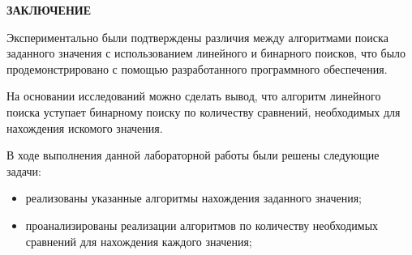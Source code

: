 \begin{center}
    \textbf{ЗАКЛЮЧЕНИЕ}
\end{center}

Экспериментально были подтверждены различия между алгоритмами поиска заданного значения с использованием линейного и бинарного поисков, что было продемонстрировано с помощью разработанного программного обеспечения.

На основании исследований можно сделать вывод, что алгоритм линейного поиска уступает бинарному поиску по количеству сравнений, необходимых для нахождения искомого значения.

\vspace{5mm}

В ходе выполнения данной лабораторной работы были решены следующие задачи:
\begin{itemize}
	\item реализованы указанные алгоритмы нахождения заданного значения;
    \item проанализированы реализации алгоритмов по количеству необходимых сравнений для нахождения каждого значения;
\end{itemize}